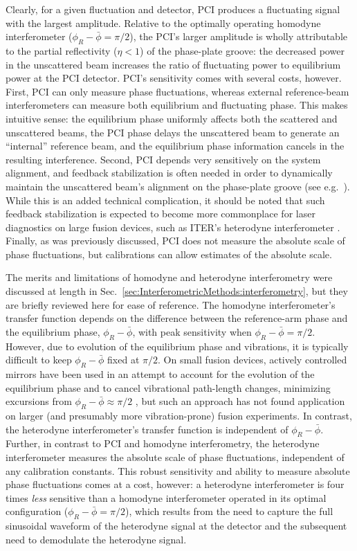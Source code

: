 Clearly, for a given fluctuation and detector,
PCI produces a fluctuating signal with the largest amplitude.
Relative to the optimally operating homodyne interferometer
($\phi_R - \bar{\phi} = \pi / 2$),
the PCI's larger amplitude is wholly attributable
to the partial reflectivity ($\eta < 1$) of the phase-plate groove:
the decreased power in the unscattered beam
increases the ratio of fluctuating power to equilibrium power
at the PCI detector.
PCI's sensitivity comes with several costs, however.
First, PCI can only measure phase fluctuations,
whereas external reference-beam interferometers
can measure both equilibrium and fluctuating phase.
This makes intuitive sense:
the equilibrium phase uniformly affects
both the scattered and unscattered beams,
the PCI phase delays the unscattered beam
to generate an ``internal'' reference beam, and
the equilibrium phase information cancels in the resulting interference.
Second, PCI depends very sensitively on the system alignment, and
feedback stabilization is often needed
in order to dynamically maintain
the unscattered beam's alignment on the phase-plate groove
(see e.g.~\cite[Ch.~3.5]{coda_phd}).
While this is an added technical complication,
it should be noted that such feedback stabilization
is expected to become more commonplace
for laser diagnostics on large fusion devices,
such as ITER's heterodyne interferometer
\cite{vanzeeland_TIP_rsi13}.
Finally, as was previously discussed,
PCI does not measure the absolute scale of phase fluctuations, but
calibrations can allow estimates of the absolute scale.

The merits and limitations of homodyne and heterodyne interferometry
were discussed at length in
Sec.~{\ref{sec:InterferometricMethods:interferometry}}, but
they are briefly reviewed here for ease of reference.
The homodyne interferometer's transfer function depends on
the difference between the reference-arm phase and
the equilibrium phase, $\phi_R - \bar{\phi}$,
with peak sensitivity when
$\phi_R - \bar{\phi} = \pi / 2$.
However, due to evolution of the equilibrium phase and vibrations,
it is typically difficult to keep $\phi_R - \bar{\phi}$ fixed at $\pi / 2$.
On small fusion devices,
actively controlled mirrors have been used in an attempt
to account for the evolution of the equilibrium phase and
to cancel vibrational path-length changes,
minimizing excursions from $\phi_R - \bar{\phi} \approx \pi / 2$
\cite{nazikian_rsi87}, but
such an approach has not found application on larger
(and presumably more vibration-prone) fusion experiments.
In contrast, the heterodyne interferometer's transfer function
is independent of $\phi_R - \bar{\phi}$.
Further, in contrast to PCI and homodyne interferometry,
the heterodyne interferometer measures
the absolute scale of phase fluctuations,
independent of any calibration constants.
This robust sensitivity and ability to measure absolute phase fluctuations
comes at a cost, however:
a heterodyne interferometer is four times \emph{less} sensitive
than a homodyne interferometer operated in its optimal configuration
($\phi_R - \bar{\phi} = \pi / 2$), which results from
the need to capture the full sinusoidal waveform
of the heterodyne signal at the detector and
the subsequent need to demodulate the heterodyne signal.


